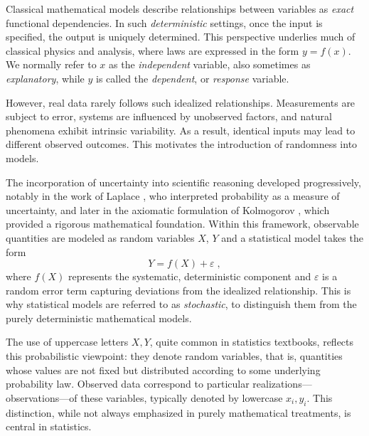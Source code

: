 Classical mathematical models describe relationships between variables as \textit{exact} functional dependencies. In such \textit{deterministic} settings, once the input is specified, the output is uniquely determined. This perspective underlies much of classical physics and analysis, where laws are expressed in the form \(y = f(x)\). We normally refer to $x$ as the \textit{independent} variable, also sometimes as \textit{explanatory}, while $y$ is called the \textit{dependent}, or \textit{response} variable.

\medskip

However, real data rarely follows such idealized relationships. Measurements are subject to error, systems are influenced by unobserved factors, and natural phenomena exhibit intrinsic variability. As a result, identical inputs may lead to different observed outcomes. This motivates the introduction of randomness into models.

\medskip

The incorporation of uncertainty into scientific reasoning developed progressively, notably in the work of Laplace \cite{laplace_1812_theorie}, who interpreted probability as a measure of uncertainty, and later in the axiomatic formulation of Kolmogorov \cite{kolmogorov_1933_grundbegriffe}, which provided a rigorous mathematical foundation. Within this framework, observable quantities are modeled as random variables $X$, $Y$ and a statistical model takes the form
\begin{equation}
    Y = f(X) + \varepsilon \; ,
\end{equation}
where \(f(X)\) represents the systematic, deterministic component and \(\varepsilon\) is a random error term capturing deviations from the idealized relationship. This is why statistical models are referred to as \textit{stochastic}, to distinguish them from the purely deterministic mathematical models.

\medskip

The use of uppercase letters \(X, Y\), quite common in statistics textbooks, reflects this probabilistic viewpoint: they denote random variables, that is, quantities whose values are not fixed but distributed according to some underlying probability law. Observed data correspond to particular realizations—observations—of these variables, typically denoted by lowercase \(x_i, y_i\). This distinction, while not always emphasized in purely mathematical treatments, is central in statistics.

